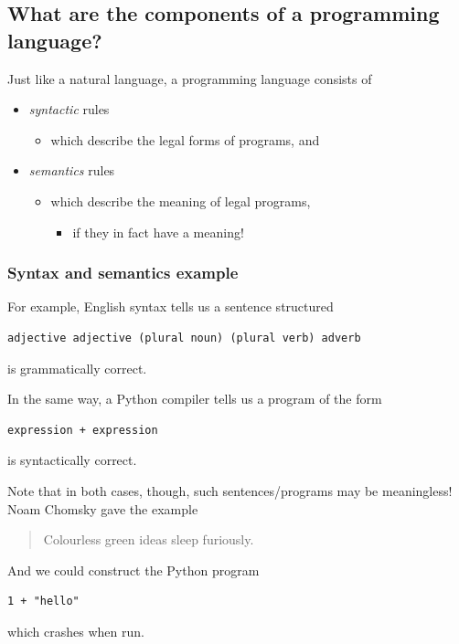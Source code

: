 \documentclass[11pt]{article}
\theoremstyle{definition}
\begin{document}
\subsection{What are the components of a programming language?}
\label{sec:org2c78087}

Just like a natural language, a programming language consists of
\begin{itemize}
\item \emph{syntactic} rules
\begin{itemize}
\item which describe the legal forms of programs, and
\end{itemize}
\item \emph{semantics} rules
\begin{itemize}
\item which describe the meaning of legal programs,
\begin{itemize}
\item if they in fact have a meaning!
\end{itemize}
\end{itemize}
\end{itemize}

\subsubsection{Syntax and semantics example}
\label{sec:org62d8d92}

For example, English syntax tells us a sentence structured
\begin{verbatim}
adjective adjective (plural noun) (plural verb) adverb
\end{verbatim}
is grammatically correct.

In the same way, a Python compiler tells us a program of the form
\begin{verbatim}
expression + expression
\end{verbatim}
is syntactically correct.

Note that in both cases, though, such sentences/programs
may be meaningless!
Noam Chomsky gave the example
\begin{quote}
Colourless green ideas sleep furiously.
\end{quote}

And we could construct the Python program
\begin{verbatim}
1 + "hello"
\end{verbatim}
which crashes when run.
\end{document}
